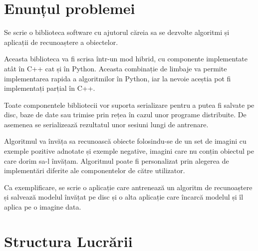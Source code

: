 













\section{Enunțul problemei}
Se scrie o biblioteca software cu ajutorul căreia sa se dezvolte algoritmi și aplicații de recunoaștere a obiectelor.

Aceasta biblioteca va fi scrisa într-un mod hibrid, cu componente implementate atât în C++ cat și în Python.
Aceasta combinație de limbaje va permite implementarea rapida a algoritmilor în Python, iar la nevoie aceștia pot fi implementați parțial în C++.

Toate componentele bibliotecii vor suporta serializare pentru a putea fi salvate pe disc, baze de date sau trimise prin rețea în cazul unor programe distribuite.
De asemenea se serializează rezultatul unor sesiuni lungi de antrenare.

Algoritmul va învăța sa recunoască obiecte folosindu-se de un set de imagini cu exemple pozitive adnotate și exemple negative, imagini care nu conțin obiectul pe care dorim sa-l învățam.
Algoritmul poate fi personalizat prin alegerea de implementări diferite ale componentelor de către utilizator.

Ca exemplificare, se scrie o aplicație care antrenează un algoritm de recunoaștere și salvează modelul învățat pe disc și o alta aplicație care încarcă modelul și îl aplica pe o imagine data.



\section{Structura Lucrării}


